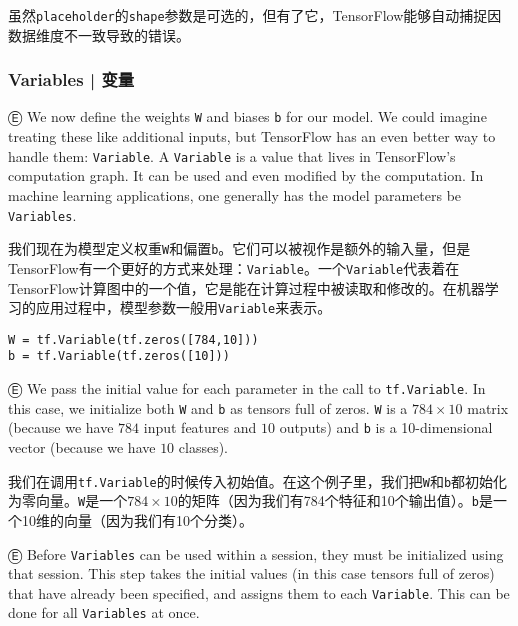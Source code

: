 虽然\lstinline{placeholder}的\lstinline{shape}参数是可选的，但有了它，TensorFlow能够自动捕捉因数据维度不一致导致的错误。



\subsubsection{Variables  |  变量}

Ⓔ \textcolor{etc}{We now define the weights \lstinline{W} and biases \lstinline{b} for our model. We could imagine treating these like additional inputs, but TensorFlow has an even better way to handle them: \lstinline{Variable}. A \lstinline{Variable} is a value that lives in TensorFlow's computation graph. It can be used and even modified by the computation. In machine learning applications, one generally has the model parameters be \lstinline{Variables}.}

我们现在为模型定义权重\lstinline{W}和偏置\lstinline{b}。它们可以被视作是额外的输入量，但是TensorFlow有一个更好的方式来处理：\lstinline{Variable}。一个\lstinline{Variable}代表着在TensorFlow计算图中的一个值，它是能在计算过程中被读取和修改的。在机器学习的应用过程中，模型参数一般用\lstinline{Variable}来表示。

\begin{lstlisting}
W = tf.Variable(tf.zeros([784,10]))
b = tf.Variable(tf.zeros([10]))
\end{lstlisting}

Ⓔ \textcolor{etc}{We pass the initial value for each parameter in the call to \lstinline{tf.Variable}. In this case, we initialize both \lstinline{W} and \lstinline{b} as tensors full of zeros. \lstinline{W} is a $784\times10$ matrix (because we have $784$ input features and $10$ outputs) and \lstinline{b} is a 10-dimensional vector (because we have $10$ classes).}

我们在调用\lstinline{tf.Variable}的时候传入初始值。在这个例子里，我们把\lstinline{W}和\lstinline{b}都初始化为零向量。\lstinline{W}是一个$784\times10$的矩阵（因为我们有784个特征和10个输出值）。\lstinline{b}是一个10维的向量（因为我们有10个分类）。

Ⓔ \textcolor{etc}{Before \lstinline{Variables} can be used within a session, they must be initialized using that session. This step takes the initial values (in this case tensors full of zeros) that have already been specified, and assigns them to each \lstinline{Variable}. This can be done for all \lstinline{Variables} at once.}


